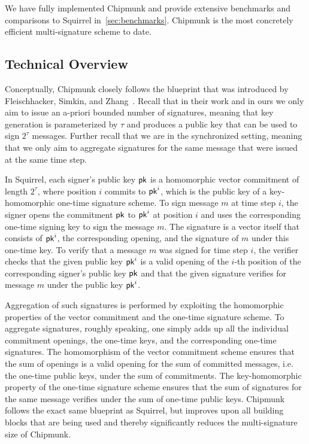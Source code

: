 We have fully implemented Chipmunk and provide extensive benchmarks and comparisons to Squirrel in~\autoref{sec:benchmarks}.
Chipmunk is the most concretely efficient multi-signature scheme to date.

\subsection{Technical Overview}

Conceptually, Chipmunk closely follows the blueprint that was introduced by Fleischhacker, Simkin, and Zhang~\cite{CCS:FleSimZha22}.
Recall that in their work and in ours we only aim to issue an a-priori bounded number of signatures, meaning that key generation is parameterized by $\tau$ and produces a public key that can be used to sign $2^\tau$ messages.
Further recall that we are in the synchronized setting, meaning that we only aim to aggregate signatures for the same message that were issued at the same time step.

In Squirrel, each signer's public key $\mathsf{pk}$ is a homomorphic vector commitment of length $2^\tau$, where position $i$ commits to $\mathsf{pk}^i$, which is the public key of a key-homomorphic one-time signature scheme.
To sign message $m$ at time step $i$, the signer opens the commitment $\mathsf{pk}$ to $\mathsf{pk}^i$ at position $i$ and uses the corresponding one-time signing key to sign the message $m$.
The signature is a vector itself that consists of $\mathsf{pk}^i$, the corresponding opening, and the signature of $m$ under this one-time key.
To verify that a message $m$ was signed for time step $i$, the verifier checks that the given public key $\mathsf{pk}^i$ is a valid opening of the $i$-th position of the corresponding signer's public key $\mathsf{pk}$ and that the given signature verifies for message $m$ under the public key $\mathsf{pk}^i$.

Aggregation of such signatures is performed by exploiting the homomorphic properties of the vector commitment and the one-time signature scheme.
To aggregate signatures, roughly speaking, one simply adds up all the individual commitment openings, the one-time keys, and the corresponding one-time signatures.
The homomorphism of the vector commitment scheme ensures that the sum of openings is a valid opening for the sum of committed messages, i.e. the one-time public keys, under the sum of commitments.
The key-homomorphic property of the one-time signature scheme ensures that the sum of signatures for the same message verifies under the sum of one-time public keys.
Chipmunk follows the exact same blueprint as Squirrel, but improves upon all building blocks that are being used and thereby significantly reduces the multi-signature size of Chipmunk.

